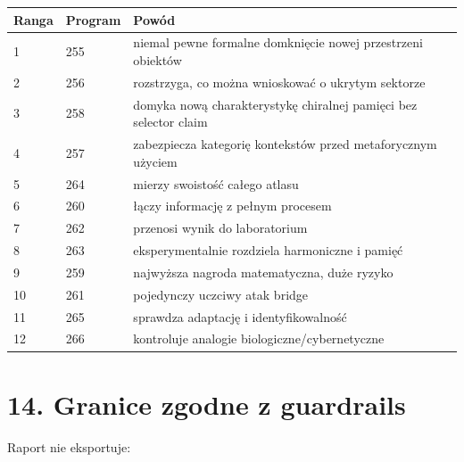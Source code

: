 \documentclass[11pt,a4paper,openany]{report}
\begin{document}
\begin{center}
\begingroup\small
\setlength{\tabcolsep}{2.5pt}
\renewcommand{\arraystretch}{1.16}
\begin{longtable}{@{}p{}p{}p{}@{}}
\toprule
\textbf{Ranga} & \textbf{Program} & \textbf{Powód} \\
\midrule
\endhead
1 & 255 & niemal pewne formalne domknięcie nowej przestrzeni obiektów \\
2 & 256 & rozstrzyga, co mo\.zna wnioskować o ukrytym sektorze \\
3 & 258 & domyka nową charakterystykę chiralnej pamięci bez selector claim \\
4 & 257 & zabezpiecza kategorię kontekstów przed metaforycznym u\.zyciem \\
5 & 264 & mierzy swoistość całego atlasu \\
6 & 260 & łączy informację z pełnym procesem \\
7 & 262 & przenosi wynik do laboratorium \\
8 & 263 & eksperymentalnie rozdziela harmoniczne i pamięć \\
9 & 259 & najwy\.zsza nagroda matematyczna, du\.ze ryzyko \\
10 & 261 & pojedynczy uczciwy atak bridge \\
11 & 265 & sprawdza adaptację i identyfikowalność \\
12 & 266 & kontroluje analogie biologiczne/\allowbreak{}cybernetyczne \\
\bottomrule
\end{longtable}
\endgroup
\end{center}

\chapter{14. Granice zgodne z guardrails}

Raport nie eksportuje:
\end{document}
